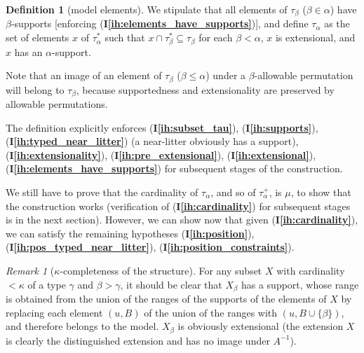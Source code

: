 \documentclass[112pt]{article}
\theoremstyle{definition}
\newtheorem{definition}[theorem]{Definition}
\theoremstyle{remark}
\newtheorem{remark}[theorem]{Remark}
\newcommand{\ihref}[1]{(\textbf{I\ref{#1}})}
\begin{document}
\begin{definition}[model elements]
We stipulate that all elements of $\tau_\beta$ ($\beta\in \alpha$) have $\beta$-supports [enforcing \ihref{ih:elements_have_supports}], and define $\tau_\alpha$ as the set of elements $x$ of $\tau^*_\alpha$ such that
$x \cap \tau^*_{\beta} \subseteq \tau_\beta$ for each $\beta<\alpha$, $x$ is extensional, and $x$ has an $\alpha$-support.

\end{definition}

Note that an image of an element of $\tau_\beta$ ($\beta\leq \alpha$)  under a $\beta$-allowable permutation will belong to $\tau_\beta$, because supportedness and extensionality are preserved by allowable permutations.

The definition explicitly enforces \ihref{ih:subset_tau}, \ihref{ih:supports}, \ihref{ih:typed_near_litter} (a near-litter obviously has a support), \ihref{ih:extensionality}, \ihref{ih:pre_extensional}, \ihref{ih:extensional}, \ihref{ih:elements_have_supports} for subsequent stages of the construction.

We still have to prove that the cardinality of $\tau_\alpha$, and so of $\tau^+_\alpha$, is $\mu$, to show that the construction works (verification of \ihref{ih:cardinality} for subsequent stages is in the next section).
{However, we can show now that given \ihref{ih:cardinality}, we can satisfy the remaining hypotheses \ihref{ih:position}, \ihref{ih:pos_typed_near_litter}, \ihref{ih:position_constraints}.}

\begin{remark}[$\kappa$-completeness of the structure]
For any subset $X$ with cardinality $<\kappa$ of a type $\gamma$ and $\beta>\gamma$, it should be clear that $X_\beta$ has a support, whose range is obtained from the union of the ranges of the supports of the elements of $X$  by replacing each element $(u,B)$ of the union of the ranges  with $(u,B \cup \{\beta\})$, and therefore belongs to the model.  $X_\beta$ is obviously extensional (the extension $X$ is clearly the distinguished extension and has no image under $A^{-1}$).
\end{remark}
\end{document}
